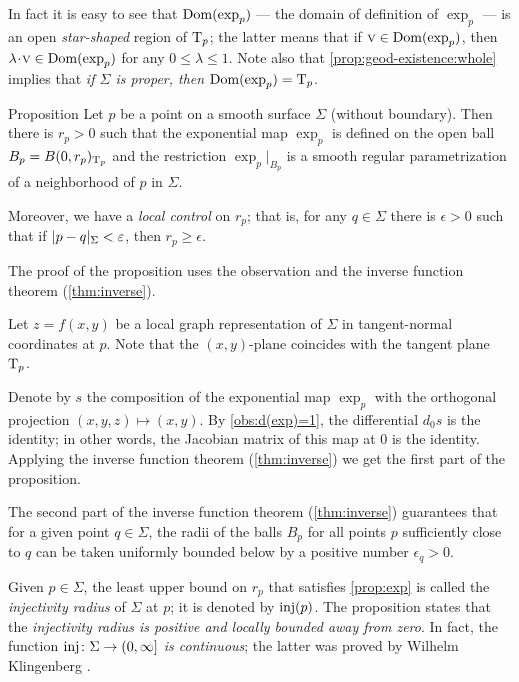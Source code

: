In fact it is easy to see that $\mathop{\rm Dom}\nolimits(\exp_p)$ --- the domain of definition of $\exp_p$ --- is an open \emph{star-shaped} region of $\mathrm{T}_p$;
the latter means that if $\text{\sc{v}}\in \mathop{\rm Dom}\nolimits(\exp_p)$, then $\lambda\cdot\vec v\in \Dom(\exp_p)$ for any $0\le \lambda\le 1$.
Note also that \ref{prop:geod-existence:whole} implies that {}\emph{if $\Sigma$ is proper, then $\mathop{\rm Dom}\nolimits(\exp_p)=\mathrm{T}_p$}.


\begin{thm}{Proposition}\label{prop:exp}
Let $p$ be a point on a smooth surface $\Sigma$ (without boundary).
Then there is $r_p>0$ such that
the exponential map $\exp_p$ is defined on the open ball $B_p=B(0,r_p)_{\mathrm{T}_p}$
and the restriction $\exp_p|_{B_p}$ is a smooth regular parametrization of a neighborhood of $p$ in $\Sigma$.

Moreover, we have a {}\emph{local control} on $r_p$;
that is, for any $q\in \Sigma$ there is $\epsilon>0$ such that if $\dist{p}{q}\Sigma<\epsilon$, then $r_p\ge\epsilon$.
\end{thm}

The proof of the proposition uses the observation and the inverse function theorem (\ref{thm:inverse}).

Let $z=f(x,y)$ be a local graph representation of $\Sigma$ in tangent-normal coordinates at $p$.
Note that the $(x,y)$-plane coincides with the tangent plane $\mathrm{T}_p$.

Denote by $s$ the composition of the exponential map $\exp_p$ with the orthogonal projection $(x,y,z)\mapsto (x,y)$.
By \ref{obs:d(exp)=1}, the differential $d_0s$ is the identity;
in other words, the Jacobian matrix of this map at $0$ is the identity.
Applying the inverse function theorem (\ref{thm:inverse}) we get the first part of the proposition.

The second part of the inverse function theorem (\ref{thm:inverse}) 
 guarantees that for a given point $q\in \Sigma$, the radii of the balls $B_p$
 for all points $p$ sufficiently close to $q$
 can be taken uniformly 
 bounded below by a positive number $\epsilon_q >0$.
\qeds

Given $p\in \Sigma$, the least upper bound on $r_p$ that satisfies \ref{prop:exp} is called the \emph{injectivity radius} of $\Sigma$ at $p$;
it is denoted by $\mathop{\rm inj}\nolimits(p)$.
The proposition states that the {}\emph{injectivity radius is positive and locally bounded away from zero}.
In fact, the function {}\emph{$\mathop{\rm inj}\nolimits\colon\Sigma\to (0,\infty]$ is continuous};
the latter was proved by Wilhelm Klingenberg \cite[5.4]{gromoll-klingenberg-meyer}. 

